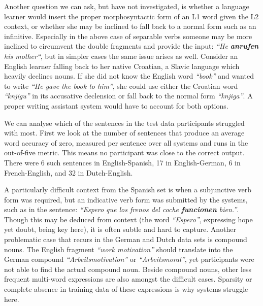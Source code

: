 Another question we can ask, but have not investigated, is whether a language
learner would insert the proper morphosyntactic form of an L1 word given the L2
context, or whether she may be inclined to fall back to a normal form such as
an infinitive. Especially in the above case of separable verbs someone may be
more inclined to circumvent the double fragments and provide the input:
\emph{``He \textbf{anrufen} his mother``}, but in simpler cases the same issue
arises as well. Consider an English learner falling back to her native
Croatian, a Slavic language which heavily declines nouns. If she did not know
the English word \emph{``book''} and wanted to write \emph{``He gave the book
to him''}, she could use either the Croatian word \emph{``knjigu''} in its
accusative declension or fall back to the normal form \emph{``knjiga''}. A
proper writing assistant system would have to account for both options. 

We can analyse which of the sentences in the test data participants struggled
with most. First we look at the number of sentences that produce an average
word accuracy of zero, measured per sentence over all systems and runs in the
out-of-five metric. This means no participant was close to the correct output.
There were 6 such sentences in English-Spanish, 17 in English-German, 6 in
French-English, and 32 in Dutch-English. 

A particularly difficult context from the Spanish set is when a subjunctive
verb form was required, but an indicative verb form was submitted by the
systems, such as in the sentence: \emph{``Espero que los frenos del coche
\textbf{funcionen} bien.''}. Though this may be deduced from context (the word
\emph{``Espero''}, expressing hope yet doubt, being key here), it is often
subtle and hard to capture. Another problematic case that recurs in the German
and Dutch data sets is compound nouns. The English fragment \emph{``work
motivation''} should translate into the German compound
\emph{``Arbeitsmotivation''} or \emph{``Arbeitsmoral''}, yet participants were
not able to find the actual compound noun. Beside compound nouns, other less
frequent multi-word expressions are also amongst the difficult cases. Sparsity
or complete absence in training data of these expressions is why systems
struggle here.




